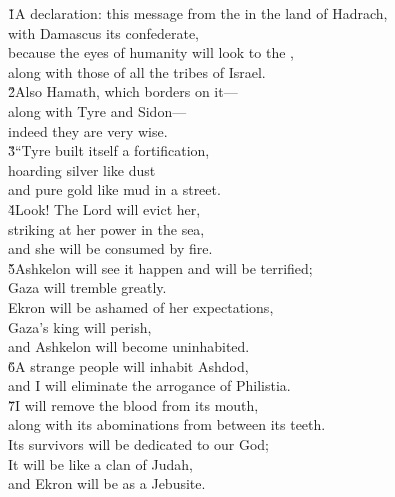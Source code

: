 \begin{poetry}
\poeml {}
\v{1}A declaration: this message from the  in the land of Hadrach, \\
\poemll    with Damascus its confederate, \\
\poeml because the eyes of humanity will look to the , \\
\poemll    along with those of all the tribes of Israel. \\
\poeml \v{2}Also Hamath, which borders on it--- \\
\poemll    along with Tyre and Sidon--- \\
\poemlll       indeed they are very wise. \\
\poeml \v{3}``Tyre built itself a fortification, \\
\poemll    hoarding silver like dust \\
\poemlll       and pure gold like mud in a street. \\
\poeml \v{4}Look! The Lord will evict her, \\
\poemll    striking at her power in the sea, \\
\poemlll       and she will be consumed by fire. \\
\poeml \v{5}Ashkelon will see it happen and will be terrified; \\
\poemll    Gaza will tremble greatly. \\
\poeml Ekron will be ashamed of her expectations, \\
\poemll    Gaza's king will perish, \\
\poemlll       and Ashkelon will become uninhabited. \\
\poeml \v{6}A strange people will inhabit Ashdod, \\
\poemll    and I will eliminate the arrogance of Philistia. \\
\poeml \v{7}I will remove the blood from its mouth, \\
\poemll    along with its abominations from between its teeth. \\
\poeml Its survivors will be dedicated to our God; \\
\poemll    It will be like a clan of Judah, \\
\poemlll       and Ekron will be as a Jebusite. \\

\end{poetry}
